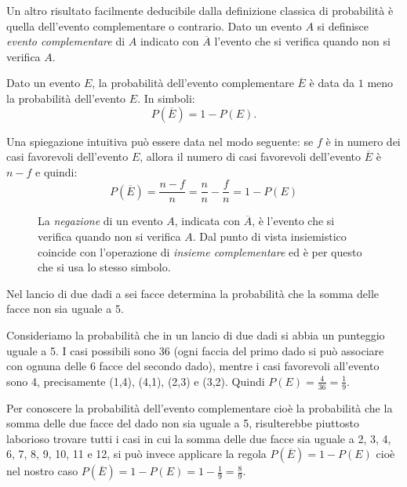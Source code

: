 Un altro risultato facilmente deducibile dalla definizione classica di 
probabilità è quella dell'evento complementare o contrario.
Dato un evento $A$ si definisce \emph{evento complementare} di $A$ indicato 
con 
$\overline A$ l'evento che si verifica quando non si verifica $A$.

\begin{teorema}
Dato un evento $E$, la probabilità dell'evento complementare $\overline E$ è 
data da $1$ meno la probabilità dell'evento $E$. In simboli: \[ P(\overline 
E)=1-P(E). \]
\end{teorema}
Una spiegazione intuitiva può essere data nel modo seguente:
se $f$ è in numero dei casi favorevoli dell'evento $E$, allora il numero di 
casi favorevoli dell'evento $\overline 
E$ è $n-f$ e quindi:
$$ P(\overline 
E)= \dfrac{n-f}{n}=\dfrac{n}{n}-\dfrac{f}{n}=1-P(E)$$

\begin{inaccessibleblock}
 \begin{figure}[htpb]
\begin{minipage}[c]{.35\textwidth}
\end{minipage}\hfil
\begin{minipage}[c]{.55\textwidth}
La \emph{negazione} di un evento $A$, indicata con $\overline A$, è 
l'evento che si verifica quando non si verifica $A$. Dal punto di vista 
insiemistico coincide con l'operazione di \emph{insieme complementare} ed è 
per 
questo che si usa lo stesso simbolo.
\end{minipage}
\end{figure}
\end{inaccessibleblock}

\begin{esempio}
Nel lancio di due dadi a sei facce determina la probabilità che la somma 
delle 
facce non sia uguale a 5.

Consideriamo la probabilità che in un lancio di due dadi si abbia un 
punteggio 
uguale a 5. I casi possibili sono 36 (ogni faccia del primo dado si può 
associare con ognuna delle 6 facce del secondo dado), mentre i casi 
favorevoli 
all'evento sono 4, precisamente (1,4), (4,1), (2,3) e (3,2). Quindi 
$P(E)=\frac 
4{36}=\frac 1 9$.

Per conoscere la probabilità dell'evento complementare cioè la probabilità 
che 
la somma delle due facce del dado non sia uguale a 5, risulterebbe piuttosto 
laborioso trovare tutti i casi in cui la somma delle due facce sia uguale a 
2, 
3, 4, 6, 7, 8, 9, 10, 11 e 12, si può invece applicare la regola $P(\overline 
E)=1-P(E)$ cioè nel nostro caso $P(\overline E)=1-P(E)=1-\frac 1 9=\frac 8 9$.
\end{esempio}


